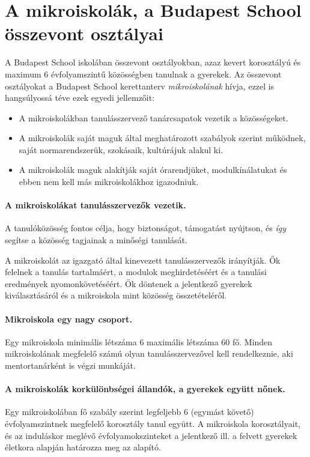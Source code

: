 \section{A mikroiskolák, a Budapest School összevont osztályai}

A Budapest School iskolában összevont osztályokban, azaz kevert korosztályú és
maximum 6 évfolyamszintű közösségben tanulnak a gyerekek. Az összevont
osztályokat a Budapest School kerettanterv \emph{mikroiskolának} hívja, ezzel
is
hangsúlyossá téve ezek egyedi jellemzőit:
\begin{itemize}
      \item A mikroiskolákban  tanulásszervező tanárcsapatok vezetik a
            közösségeket.
      \item A mikroiskolák saját maguk által meghatározott
            szabályok szerint működnek, saját normarendszerük, szokásaik,
            kultúrájuk alakul ki.
      \item A mikroiskolák maguk alakítják saját órarendjüket, modulkínálatukat
            és ebben nem kell más mikroiskolákhoz igazodniuk.
\end{itemize}


\paragraph{A mikroiskolákat tanulásszervezők vezetik.}

A tanulóközösség fontos célja, hogy biztonságot, támogatást nyújtson, és
\emph{így} segítse a közösség tagjainak a minőségi tanulását.

A mikroiskolát az igazgató által kinevezett tanulásszervezők irányítják.
Ők felelnek a tanulás tartalmáért, a modulok meghirdetéséért és a
tanulási eredmények nyomonkövetéséért. Ők döntenek a jelentkező gyerekek
kiválasztásáról és a mikroiskola mint közösség összetételéről.

\paragraph{Mikroiskola egy nagy csoport.}

Egy mikroiskola minimális létszáma 6 maximális létszáma 60 fő. Minden
mikroiskolának megfelelő számú olyan tanulásszervezővel kell
rendelkeznie, aki mentortanárként is végzi munkáját.

\paragraph{A mikroiskolák korkülönbségei állandók, a gyerekek együtt nőnek.}
Egy mikroiskolában fő szabály szerint legfeljebb 6 (egymást követő)
évfolyamszintnek megfelelő korosztály tanul együtt. A mikroiskola
korosztályait, és az induláskor meglévő évfolyamokszinteket a jelentkező ill. a
felvett gyerekek életkora alapján határozza meg az alapító.

